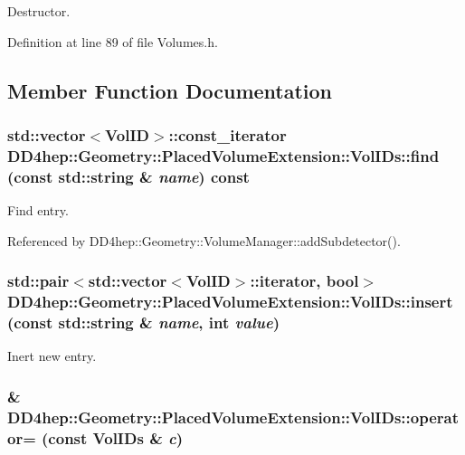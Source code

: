 Destructor. 

Definition at line 89 of file Volumes.h.

\subsection{Member Function Documentation}
\hypertarget{class_d_d4hep_1_1_geometry_1_1_placed_volume_extension_1_1_vol_i_ds_ab81a867b54e328f612c96d4b92edeb50}{
\subsubsection[{find}]{\setlength{\rightskip}{0pt plus 5cm}std::vector$<${\bf VolID}$>$::const\_\-iterator DD4hep::Geometry::PlacedVolumeExtension::VolIDs::find (const std::string \& {\em name}) const}}
\label{class_d_d4hep_1_1_geometry_1_1_placed_volume_extension_1_1_vol_i_ds_ab81a867b54e328f612c96d4b92edeb50}


Find entry. 

Referenced by DD4hep::Geometry::VolumeManager::addSubdetector().\hypertarget{class_d_d4hep_1_1_geometry_1_1_placed_volume_extension_1_1_vol_i_ds_a2902573e21128ccbe7ca2ec2b51c89d5}{
\subsubsection[{insert}]{\setlength{\rightskip}{0pt plus 5cm}std::pair$<$std::vector$<${\bf VolID}$>$::iterator, bool$>$ DD4hep::Geometry::PlacedVolumeExtension::VolIDs::insert (const std::string \& {\em name}, \/  int {\em value})}}
\label{class_d_d4hep_1_1_geometry_1_1_placed_volume_extension_1_1_vol_i_ds_a2902573e21128ccbe7ca2ec2b51c89d5}


Inert new entry. \hypertarget{class_d_d4hep_1_1_geometry_1_1_placed_volume_extension_1_1_vol_i_ds_a92f2c199ac269cbe4654be12f268bb3d}{
\subsubsection[{operator=}]{\& DD4hep::Geometry::PlacedVolumeExtension::VolIDs::operator= (const {\bf VolIDs} \& {\em c})}}
\label{class_d_d4hep_1_1_geometry_1_1_placed_volume_extension_1_1_vol_i_ds_a92f2c199ac269cbe4654be12f268bb3d}


